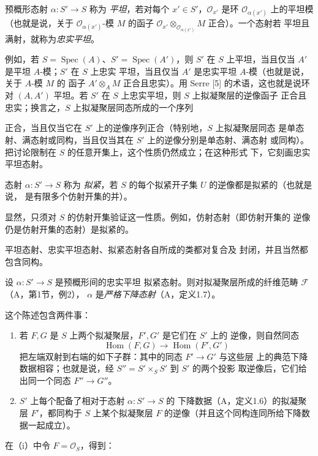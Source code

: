  预概形态射 $\alpha:S'\longrightarrow S$ 称为
\emph{平坦}，若对每个 $x'\in S'$，$\mathcal O_{x'}$ 是环
$\mathcal O_{\alpha(x')}$ 上的平坦模（也就是说，关于
$\mathcal O_{\alpha(x')}$-模 $M$ 的函子
$\mathcal O_{x'}\otimes_{\mathcal O_{\alpha(x')}}M$ 正合）。一个态射若
平坦且满射，就称为\emph{忠实平坦}。

例如，若 $S=\operatorname{Spec}(A)$、$S'=\operatorname{Spec}(A')$，则
$S'$ 在 $S$ 上平坦，当且仅当 $A'$ 是平坦 $A$-模；$S'$ 在 $S$ 上忠实
平坦，当且仅当 $A'$ 是忠实平坦 $A$-模（也就是说，关于 $A$-模 $M$ 的
函子 $A'\otimes_A M$ 正合且忠实）。用 Serre [5] 的术语，这也就是说环对
$(A,A')$ 平坦。若 $S'$ 在 $S$ 上忠实平坦，则 $S$ 上拟凝聚层的逆像函子
正合且忠实；换言之，$S$ 上拟凝聚层同态所成的一个序列

正合，当且仅当它在 $S'$ 上的逆像序列正合（特别地，$S$ 上拟凝聚层同态
是单态射、满态射或同构，当且仅当其在 $S'$ 上的逆像分别是单态射、满态射
或同构）。把讨论限制在 $S$ 的任意开集上，这个性质仍然成立；在这种形式
下，它刻画忠实平坦态射。

 态射 $\alpha:S'\longrightarrow S$ 称为
\emph{拟紧}，若 $S$ 的每个拟紧开子集 $U$ 的逆像都是拟紧的（也就是说，
是有限多个仿射开集的并）。

显然，只须对 $S$ 的仿射开集验证这一性质。例如，仿射态射（即仿射开集的
逆像仍是仿射开集的态射）是拟紧的。

平坦态射、忠实平坦态射、拟紧态射各自所成的类都对复合及
封闭，并且当然都包含同构。

 设 $\alpha:S'\longrightarrow S$ 是预概形间的忠实平坦
拟紧态射。则对拟凝聚层所成的纤维范畴 $\mathcal F$（A，第1节，例2），
$\alpha$ 是\emph{严格下降态射}（A，定义1.7）。

这个陈述包含两件事：
\begin{enumerate}
\item[(i)] 若 $F,G$ 是 $S$ 上两个拟凝聚层，$F',G'$ 是它们在 $S'$ 上的
逆像，则自然同态
\[
  \operatorname{Hom}(F,G)\longrightarrow\operatorname{Hom}(F',G')
\]
把左端双射到右端的如下子群：其中的同态 $F'\longrightarrow G'$ 与这些层
上的典范下降数据相容；也就是说，经 $S''=S'\times_SS'$ 到 $S'$ 的两个投影
取逆像后，它们给出同一个同态 $F''\longrightarrow G''$。
\item[(ii)] $S'$ 上每个配备了相对于态射 $\alpha:S'\longrightarrow S$ 的
下降数据（A，定义1.6）的拟凝聚层 $F'$，都同构于 $S$ 上某个拟凝聚层 $F$
的逆像（并且这个同构连同所给下降数据一起成立）。
\end{enumerate}
在（i）中令 $F=\mathcal O_S$，得到：

